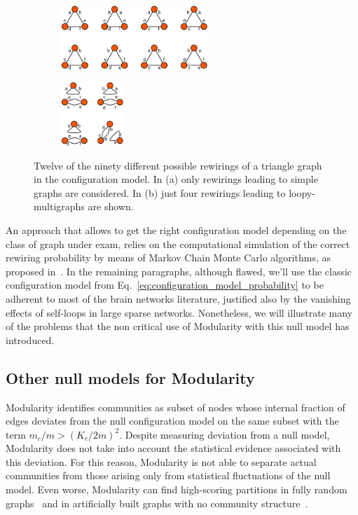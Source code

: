 \begin{figure}[htb]\centering
\begin{subfigure}[t]{0.45\textwidth}\centering
\includegraphics[height=2.4cm]{images/configuration_model_six_stubs.pdf}
\caption{}
\label{fig:reshuffle_simple_graphs}
\end{subfigure}
\begin{subfigure}[t]{0.45\textwidth}\centering
\includegraphics[height=2.4cm]{images/configuration_model_three_stubs.pdf}
\caption{}
\label{fig:reshuffle_loopy_multigraphs}
\end{subfigure}
\caption{Twelve of the ninety different possible rewirings of a triangle graph in the configuration model. In (a) only rewirings leading to simple graphs are considered. In (b) just four rewirings leading to loopy-multigraphs are shown.}
\label{fig:configuration_model_stubs}
\end{figure}
An approach that allows to get the right configuration model depending on the class of graph under exam, relies on the computational simulation of the correct rewiring probability by means of Markov Chain Monte Carlo algorithms, as proposed in~\cite{fosdick2016}.
In the remaining paragraphs, although flawed, we'll use the classic configuration model from Eq.~\ref{eq:configuration_model_probability} to be adherent to most of the brain networks literature, justified also by the vanishing effects of self-loops in large sparse networks. Nonetheless, we will illustrate many of the problems that the non critical use of Modularity with this null model has introduced.

\subsection{Other null models for Modularity}
Modularity identifies communities as subset of nodes whose internal fraction of edges deviates from the null configuration model on the same subset with the term $m_c/m > (K_c/2m)^2$.
Despite measuring deviation from a null model, Modularity does not take into account the statistical evidence associated with this deviation. For this reason, Modularity is not able to separate actual communities from those arising only from statistical fluctuations of the null model. Even worse, Modularity can find high-scoring partitions in fully random graphs~\cite{guimera2004} and in artificially built graphs with no community structure~\cite{kehagias2013}.

